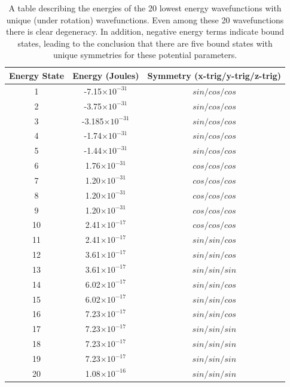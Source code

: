 \documentclass[12pt]{article}
\begin{document}
\begin{table}
\begin{center}
\begin{tabular}{|c|c|c|}
\hline
Energy State & Energy (Joules) & Symmetry (x-trig/y-trig/z-trig)\\
\hline
1 & -7.15$\times 10^{-31}$ & $sin/cos/cos$ \\
2 & -3.75$\times 10^{-31}$ & $sin/cos/cos$ \\
3 & -3.185$\times 10^{-31}$& $sin/cos/cos$ \\
4 & -1.74$\times 10^{-31} $ & $sin/cos/cos$ \\
5 & -1.44$\times 10^{-31}$ & $sin/cos/cos$ \\
6 & 1.76$\times 10^{-31}$ & $cos/cos/cos$ \\
7 & 1.20$\times 10^{-31}$ & $cos/cos/cos$ \\
8 & 1.20$\times 10^{-31}$ & $cos/cos/cos$ \\
9 & 1.20$\times 10^{-31}$ & $cos/cos/cos$ \\
10 & 2.41$\times 10^{-17}$ & $cos/cos/cos$ \\
11 & 2.41$\times 10^{-17}$ & $sin/sin/cos$ \\
12 & 3.61$\times 10^{-17}$ & $sin/sin/cos$ \\
13 & 3.61$\times 10^{-17}$ & $sin/sin/sin$ \\
14 & 6.02$\times 10^{-17}$ & $sin/sin/cos$ \\
15 & 6.02$\times 10^{-17}$ & $sin/sin/cos$ \\
16 & 7.23$\times 10^{-17}$ & $sin/sin/cos$ \\
17 & 7.23$\times 10^{-17}$ & $sin/sin/sin$ \\
18 & 7.23$\times 10^{-17}$ & $sin/sin/sin$ \\
19 & 7.23$\times 10^{-17}$ & $sin/sin/sin$ \\
20 & 1.08$\times 10^{-16}$ & $sin/sin/sin$ \\
\hline
\end{tabular}
\end{center}
\caption{\label{3denergies}A table describing the energies of the 20 lowest energy wavefunctions with unique (under rotation) wavefunctions.  Even among these 20 wavefunctions there is clear degeneracy.  In addition, negative energy terms indicate bound states, leading to the conclusion that there are five bound states with unique symmetries for these potential parameters.}
\end{table}
\end{document}
